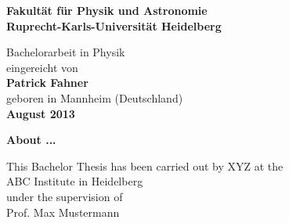 \begin{titlepage}
\begin{center}
 
\Large\textbf{Fakultät für Physik und Astronomie\\
Ruprecht-Karls-Universität Heidelberg}

\vspace{17cm}

\normalsize
Bachelorarbeit in Physik\\
eingereicht von\\
\vspace{0.5cm}
\Large\textbf{Patrick Fahner}\\
\normalsize
\vspace{0.5cm}
geboren in Mannheim (Deutschland)\\
\vspace{0.5cm}
\Large\textbf{August 2013}
\normalsize

\newpage




\Large\textbf{About ...}

\vspace{18cm}

\normalsize
This Bachelor Thesis has been carried out by XYZ at the\\
ABC Institute in Heidelberg\\
under the supervision of\\
Prof. Max Mustermann

\vfill
\end{center}

\end{titlepage}
